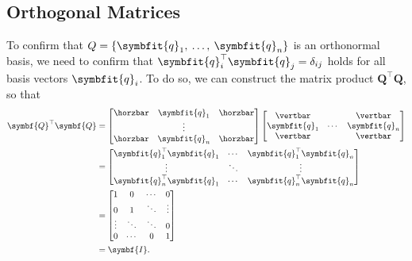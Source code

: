 \documentclass{article}
\begin{document}
\subsection{Orthogonal Matrices}
To confirm that \(Q = \left\{ \symbfit{q}_1,\: \dots,\: \symbfit{q}_n \right\}\) is an orthonormal basis, we need to confirm that \(\symbfit{q}_i^\top \symbfit{q}_j = \delta_{ij}\) holds for
all basis vectors \(\symbfit{q}_i\).
To do so, we can construct the matrix product \(\symbf{Q}^\top \symbf{Q}\), so that
\begin{align*}
    \symbf{Q}^\top \symbf{Q} & = \begin{bmatrix}
                                     \horzbar & \symbfit{q}_1 & \horzbar \\
                                              & \vdots                   \\
                                     \horzbar & \symbfit{q}_n & \horzbar
                                 \end{bmatrix} \begin{bmatrix}
                                                   \vertbar      &        & \vertbar      \\
                                                   \symbfit{q}_1 & \cdots & \symbfit{q}_n \\
                                                   \vertbar      &        & \vertbar
                                               \end{bmatrix}                         \\
                             & = \begin{bmatrix}
                                     \symbfit{q}_1^\top \symbfit{q}_1 & \cdots & \symbfit{q}_1^\top\symbfit{q}_n  \\
                                     \vdots                           & \ddots & \vdots                           \\
                                     \symbfit{q}_n^\top \symbfit{q}_1 & \cdots & \symbfit{q}_n^\top \symbfit{q}_n
                                 \end{bmatrix} \\
                             & = \begin{bmatrix}
                                     1      & 0      & \cdots & 0      \\
                                     0      & 1      & \ddots & \vdots \\
                                     \vdots & \ddots & \ddots & 0      \\
                                     0      & \cdots & 0      & 1
                                 \end{bmatrix}                                            \\
                             & = \symbf{I}.
\end{align*}
\end{document}
